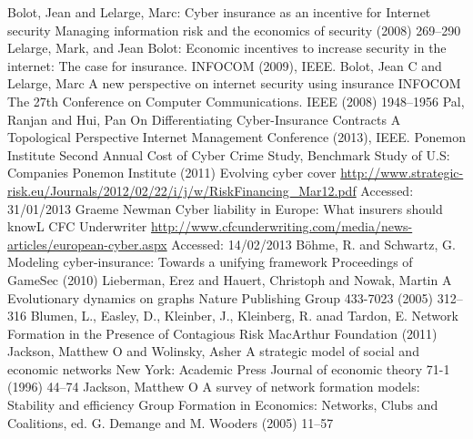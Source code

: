 \documentclass{llncs}
\begin{document}

%
\begin{thebibliography}{[MT1]}
%
  Bolot, Jean and Lelarge, Marc:
  Cyber insurance as an incentive for Internet security
  Managing information risk and the economics of security
  (2008) 269--290
%
	Lelarge, Mark, and Jean Bolot:
	Economic incentives to increase security in the internet: The case for insurance.
	INFOCOM (2009), IEEE.
%
	Bolot, Jean C and Lelarge, Marc
 	A new perspective on internet security using insurance
 	INFOCOM The 27th Conference on Computer Communications. IEEE
 	(2008) 1948--1956
	Pal, Ranjan and Hui, Pan	
	On Differentiating Cyber-Insurance Contracts A Topological Perspective
  	Internet Management Conference (2013), IEEE.
%
Ponemon Institute
Second Annual Cost of Cyber Crime Study, Benchmark Study of U.S: Companies
Ponemon Institute (2011)
%
  Evolving cyber cover
  \url{http://www.strategic-risk.eu/Journals/2012/02/22/i/j/w/RiskFinancing_Mar12.pdf}
  Accessed: 31/01/2013
	Graeme Newman
	Cyber liability in Europe: What insurers should knowL
	CFC Underwriter \url{http://www.cfcunderwriting.com/media/news-articles/european-cyber.aspx}
 	Accessed: 14/02/2013
  B{\"o}hme, R. and Schwartz, G.
  Modeling cyber-insurance: Towards a unifying framework
  Proceedings of GameSec (2010)
%
Lieberman, Erez and Hauert, Christoph and Nowak, Martin A
 Evolutionary dynamics on graphs
Nature Publishing Group 433-7023 (2005) 312--316
%
Blumen, L., Easley, D., Kleinber, J.,  Kleinberg, R. anad Tardon, E.
Network Formation in the Presence of Contagious Risk
MacArthur Foundation (2011)
 Jackson, Matthew O and Wolinsky, Asher
 A strategic model of social and economic networks
 New York: Academic Press Journal of economic theory 71-1 (1996) 44--74
%
Jackson, Matthew O
A survey of network formation models: Stability and efficiency
Group Formation in Economics: Networks, Clubs and Coalitions, ed. G. Demange and M. Wooders (2005) 11--57 

\end{thebibliography}
%
\end{document}
